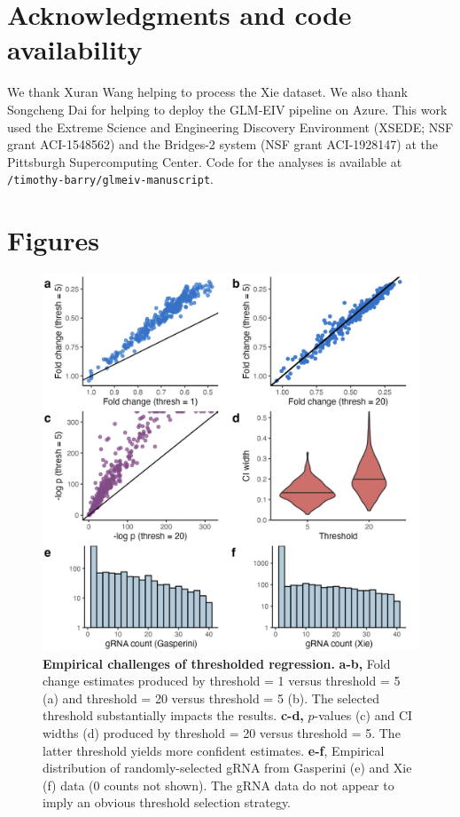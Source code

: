 \documentclass[12pt]{article}
\begin{document}
\section{Acknowledgments and code availability}
We thank Xuran Wang helping to process the Xie dataset. We also thank Songcheng Dai for helping to deploy the GLM-EIV pipeline on Azure. This work used the Extreme Science and Engineering Discovery Environment (XSEDE; NSF grant ACI-1548562) and the Bridges-2 system (NSF grant ACI-1928147) at the Pittsburgh Supercomputing Center. Code for the analyses is available at \texttt{/timothy-barry/glmeiv-manuscript}.

\printbibliography

\section*{Figures}


\clearpage
\begin{figure}[h!]
	\centering
	\includegraphics[width=1\linewidth]{../../figures/thresholding_empirical/plot}
	\caption{\textbf{Empirical challenges of thresholded regression.} \textbf{a-b,} Fold change estimates produced by threshold = 1 versus threshold = 5 (a) and threshold = 20 versus threshold = 5 (b). The selected threshold substantially impacts the results. \textbf{c-d,} $p$-values (c) and CI widths (d) produced by threshold = 20 versus threshold = 5. The latter threshold yields more confident estimates. \textbf{e-f}, Empirical distribution of randomly-selected gRNA from Gasperini (e) and Xie (f) data (0 counts not shown). The gRNA data do not appear to imply an obvious threshold selection strategy.}
	\label{thresholding_empirical}
\end{figure}
\end{document}
